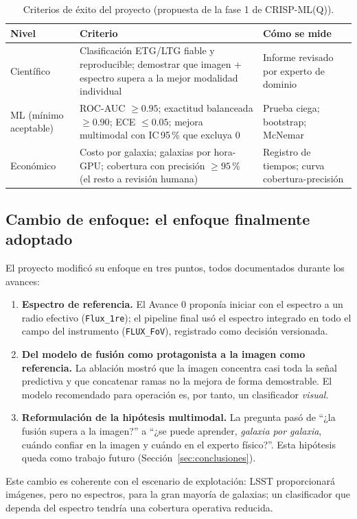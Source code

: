 \begin{table}[htbp]
\centering
\caption{Criterios de éxito del proyecto (propuesta de la fase 1 de CRISP-ML(Q)).}
\label{tab:criterios}
\small
\begin{tabularx}{\textwidth}{lYY}
\toprule
\textbf{Nivel} & \textbf{Criterio} & \textbf{Cómo se mide}\\
\midrule
Científico & Clasificación ETG/LTG fiable y reproducible; demostrar que imagen + espectro supera a la mejor modalidad individual & Informe revisado por experto de dominio\\
ML (mínimo aceptable) & ROC-AUC $\geq 0.95$; exactitud balanceada $\geq 0.90$; ECE $\leq 0.05$; mejora multimodal con IC\,95\,\% que excluya 0 & Prueba ciega; bootstrap; McNemar\\
Económico & Costo por galaxia; galaxias por hora-GPU; cobertura con precisión $\geq 95\,\%$ (el resto a revisión humana) & Registro de tiempos; curva cobertura-precisión\\
\bottomrule
\end{tabularx}
\end{table}

\subsection{Cambio de enfoque: el enfoque finalmente adoptado}
El proyecto modificó su enfoque en tres puntos, todos documentados durante los avances:
\begin{enumerate}
  \item \textbf{Espectro de referencia.} El Avance 0 proponía iniciar con el espectro a un radio efectivo (\texttt{Flux\_1re}); el pipeline final usó el espectro integrado en todo el campo del instrumento (\texttt{FLUX\_FoV}), registrado como decisión versionada.
  \item \textbf{Del modelo de fusión como protagonista a la imagen como referencia.} La ablación mostró que la imagen concentra casi toda la señal predictiva y que concatenar ramas no la mejora de forma demostrable. El modelo recomendado para operación es, por tanto, un clasificador \emph{visual}.
  \item \textbf{Reformulación de la hipótesis multimodal.} La pregunta pasó de ``¿la fusión supera a la imagen?'' a ``¿se puede aprender, \emph{galaxia por galaxia}, cuándo confiar en la imagen y cuándo en el experto físico?''. Esta hipótesis queda como trabajo futuro (Sección~\ref{sec:conclusiones}).
\end{enumerate}
Este cambio es coherente con el escenario de explotación: LSST proporcionará imágenes, pero no espectros, para la gran mayoría de galaxias; un clasificador que dependa del espectro tendría una cobertura operativa reducida.

